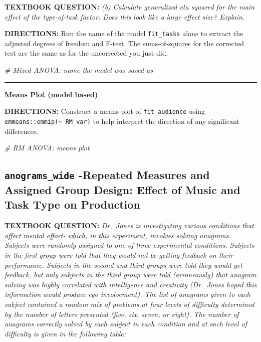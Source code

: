 \documentclass[]{article}
\newenvironment{Shaded}{\begin{snugshade}}{\end{snugshade}}
\newcommand{\CommentTok}[1]{\textcolor[rgb]{0.56,0.35,0.01}{\textit{#1}}}
\begin{document}
\textbf{TEXTBOOK QUESTION:} \emph{(b) Calculate generalized eta squared
for the main effect of the type-of-task factor. Does this look like a
large effect size? Explain.}

\textbf{DIRECTIONS:} Run the name of the model \texttt{fit\_tasks} alone
to extract the adjusted degrees of freedom and F-test. The
sums-of-squares for the corrected test are the same as for the
uncorrected you just did.

\begin{Shaded}
\begin{Highlighting}[]
\CommentTok{# Mixed ANOVA: name the model was saved as}
\end{Highlighting}
\end{Shaded}

\begin{center}\rule{0.5\linewidth}{\linethickness}\end{center}

\textbf{Means Plot (model based)}

\textbf{DIRECTIONS:} Construct a means plot of \texttt{fit\_audience}
using \texttt{emmeans::emmip(\textasciitilde{}\ RM\_var)} to help
interpret the direction of any significant differences.

\begin{Shaded}
\begin{Highlighting}[]
\CommentTok{# RM ANOVA: means plot}
\end{Highlighting}
\end{Shaded}

\clearpage

\subsection{\texorpdfstring{\texttt{anograms\_wide} -Repeated Measures
and Assigned Group Design: Effect of Music and Task Type on
Production}{anograms\_wide -Repeated Measures and Assigned Group Design: Effect of Music and Task Type on Production}}\label{anograms_wide--repeated-measures-and-assigned-group-design-effect-of-music-and-task-type-on-production}

\textbf{TEXTBOOK QUESTION:} \emph{Dr.~Jones is investigating various
conditions that affect mental effort- which, in this experiment,
involves solving anagrams. Subjects were randomly assigned to one of
three experimental conditions. Subjects in the first group were told
that they would not be getting feedback on their performance. Subjects
in the second and third groups were told they would get feedback, but
only subjects in the third group were told (erroneously) that anagram
solving was highly correlated with intelligence and creativity
(Dr.~Jones hoped this information would produce ego involvement). The
list of anagrams given to each subject contained a random mix of
problems at four levels of difficulty determined by the number of
letters presented (five, six, seven, or eight). The number of anagrams
correctly solved by each subject in each condition and at each level of
difficulty is given in the following table:}
\end{document}
